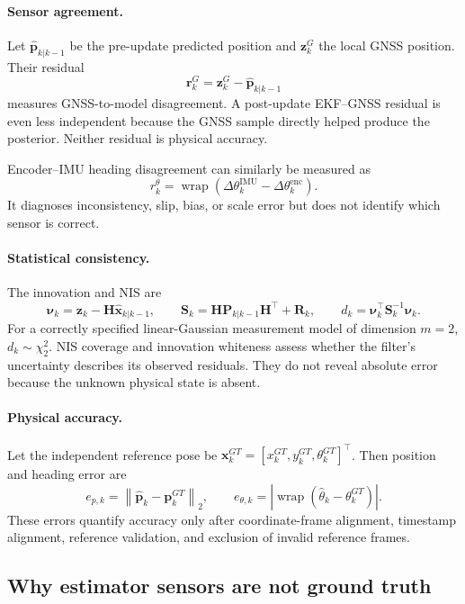 \documentclass[11pt,a4paper]{article}
\newcommand{\wrap}{\operatorname{wrap}}
\begin{document}
\paragraph{Sensor agreement.}
Let $\hat{\mathbf p}_{k|k-1}$ be the pre-update predicted position and
$\mathbf z_k^{G}$ the local GNSS position. Their residual
\[
\mathbf r_k^{G}=\mathbf z_k^{G}-\hat{\mathbf p}_{k|k-1}
\]
measures GNSS-to-model disagreement. A post-update EKF--GNSS residual is even
less independent because the GNSS sample directly helped produce the posterior.
Neither residual is physical accuracy.

Encoder--IMU heading disagreement can similarly be measured as
\[
r_k^\theta =
\wrap\!\left(\Delta\theta_k^{\mathrm{IMU}}
-\Delta\theta_k^{\mathrm{enc}}\right).
\]
It diagnoses inconsistency, slip, bias, or scale error but does not identify
which sensor is correct.

\paragraph{Statistical consistency.}
The innovation and NIS are
\[
\boldsymbol\nu_k=\mathbf z_k-\mathbf H\hat{\mathbf x}_{k|k-1},
\qquad
\mathbf S_k=\mathbf H\mathbf P_{k|k-1}\mathbf H^\top+\mathbf R_k,
\qquad
d_k=\boldsymbol\nu_k^\top\mathbf S_k^{-1}\boldsymbol\nu_k.
\]
For a correctly specified linear-Gaussian measurement model of dimension
$m=2$, $d_k\sim\chi^2_2$. NIS coverage and innovation whiteness assess whether
the filter's uncertainty describes its observed residuals. They do not reveal
absolute error because the unknown physical state is absent.

\paragraph{Physical accuracy.}
Let the independent reference pose be
$\mathbf x_k^{GT}=[x_k^{GT},y_k^{GT},\theta_k^{GT}]^\top$. Then position and
heading error are
\[
e_{p,k}=\left\|\hat{\mathbf p}_k-\mathbf p_k^{GT}\right\|_2,
\qquad
e_{\theta,k}=\left|\wrap(\hat\theta_k-\theta_k^{GT})\right|.
\]
These errors quantify accuracy only after coordinate-frame alignment,
timestamp alignment, reference validation, and exclusion of invalid reference
frames.

\subsection{Why estimator sensors are not ground truth}
\end{document}
